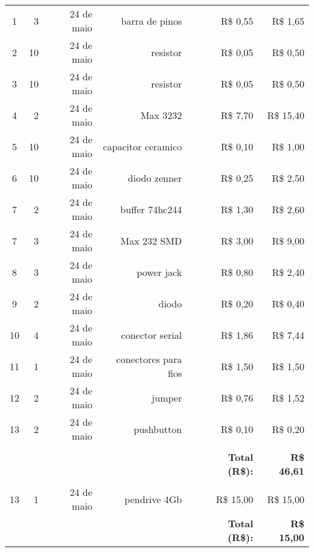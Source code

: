 \begin{table}[!h]
\begin{tabular}{crrrrrr}
    1     & 3     & 24 de maio & barra de pinos & \multicolumn{1}{l}{} & R\$ 0,55 & R\$ 1,65 \\
    2     & 10    & 24 de maio & resistor & \multicolumn{1}{l}{} & R\$ 0,05 & R\$ 0,50 \\
    3     & 10    & 24 de maio & resistor & \multicolumn{1}{l}{} & R\$ 0,05 & R\$ 0,50 \\
    4     & 2     & 24 de maio & Max 3232 & \multicolumn{1}{l}{} & R\$ 7,70 & R\$ 15,40 \\
    5     & 10    & 24 de maio & capacitor ceramico & \multicolumn{1}{l}{} & R\$ 0,10 & R\$ 1,00 \\
    6     & 10    & 24 de maio & diodo zenner & \multicolumn{1}{l}{} & R\$ 0,25 & R\$ 2,50 \\
    7     & 2     & 24 de maio & buffer 74hc244 & \multicolumn{1}{l}{} & R\$ 1,30 & R\$ 2,60 \\
    7     & 3     & 24 de maio & Max 232 SMD & \multicolumn{1}{l}{} & R\$ 3,00 & R\$ 9,00 \\
    8     & 3     & 24 de maio & power jack & \multicolumn{1}{l}{} & R\$ 0,80 & R\$ 2,40 \\
    9     & 2     & 24 de maio & diodo & \multicolumn{1}{l}{} & R\$ 0,20 & R\$ 0,40 \\
    10    & 4     & 24 de maio & conector serial & \multicolumn{1}{l}{} & R\$ 1,86 & R\$ 7,44 \\
    11    & 1     & 24 de maio & conectores para fios & \multicolumn{1}{l}{} & R\$ 1,50 & R\$ 1,50 \\
    12    & 2     & 24 de maio & jumper & \multicolumn{1}{l}{} & R\$ 0,76 & R\$ 1,52 \\
    13    & 2     & 24 de maio & pushbutton & \multicolumn{1}{l}{} & R\$ 0,10 & R\$ 0,20 \\
          &       & \multicolumn{1}{c}{} & \multicolumn{1}{l}{} & \multicolumn{1}{l}{} &       &  \\
          &       & \multicolumn{1}{c}{} & \multicolumn{1}{l}{} & \multicolumn{1}{l}{} & \textbf{Total (R\$):} & \textbf{R\$ 46,61} \\
          &       & \multicolumn{1}{c}{} & \multicolumn{1}{l}{} & \multicolumn{1}{l}{} & \textbf{} & \textbf{} \\
    13    & 1     & 24 de maio & pendrive 4Gb & \multicolumn{1}{l}{} & R\$ 15,00 & R\$ 15,00 \\
          &       & \multicolumn{1}{c}{} & \multicolumn{1}{l}{} & \multicolumn{1}{l}{} & \textbf{Total (R\$):} & \textbf{R\$ 15,00} \\

\end{tabular}
\end{table}
